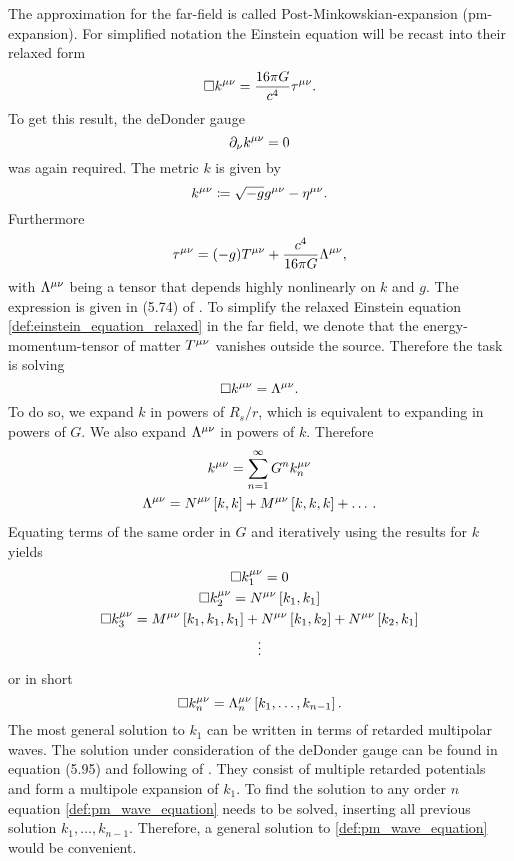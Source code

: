 The approximation for the far-field is called Post-Minkowskian-expansion (\gls{pm}-expansion). For simplified notation the Einstein equation will be recast into their relaxed form
\begin{equation}\label{def:einstein_equation_relaxed}
\Box k^{\mu\nu} = \frac{16\pi G}{c^4}\tau^{\mu\nu}.
\end{equation}
To get this result, the deDonder gauge
\begin{equation}
\partial_\nu k^{{\mu\nu}}=0
\end{equation}
was again required. The metric $k$ is given by
\begin{equation}
k^{\mu\nu}\coloneqq \sqrt{-g}g^{\mu\nu} -\eta^{\mu\nu}.
\end{equation}
Furthermore
\begin{equation}\label{def:pn_tau}
\tau^{\mu\nu} = {\left( -g \right)}T^{\mu\nu} + \frac{c^4}{16\pi G}\Lambda^{\mu\nu},
\end{equation}
with $\Lambda^{\mu\nu}$ being a tensor that depends highly nonlinearly on $k$ and $g$. The expression is given in (5.74) of \cite{gwv1}. To simplify the relaxed Einstein equation \eqref{def:einstein_equation_relaxed} in the far field, we denote that the energy-momentum-tensor of matter $T^{\mu\nu}$ vanishes outside the source. Therefore the task is solving
\begin{equation}
\Box k^{\mu\nu} = \Lambda^{\mu\nu}.
\end{equation}
To do so, we expand $k$ in powers of $R_s/r$, which is equivalent to expanding in powers of $G$. We also expand $\Lambda^{\mu\nu}$ in powers of $k$. Therefore
\begin{gather}
k^{\mu\nu}=\sum_{n=1}^\infty G^n k^{\mu\nu}_n\\
\Lambda^{\mu\nu} = N^{\mu\nu}\left[k,k\right] + M^{\mu\nu}\left[k,k,k\right]+\dotsc.
\end{gather}
Equating terms of the same order in $G$ and iteratively using the results for $k$ yields
\begin{gather}
\Box k^{\mu\nu}_1=0\\
\Box k^{\mu\nu}_2 = N^{\mu\nu}\left[k_1, k_1\right]\\
\Box k^{\mu\nu}_3 = M^{\mu\nu}\left[k_1, k_1, k_1\right]+N^{\mu\nu}\left[k_1,k_2\right]+N^{\mu\nu}\left[k_2,k_1\right]\\
\vdots\nonumber
\end{gather}
or in short
\begin{equation}\label{def:pm_wave_equation}
\Box k^{\mu\nu}_n=\Lambda^{\mu\nu}_n\left[k_1, \dotsc, k_{n-1}\right].
\end{equation}
The most general solution to $k_1$ can be written in terms of retarded multipolar waves. The solution under consideration of the deDonder gauge can be found in equation (5.95) and following of \cite{gwv1}. They consist of multiple retarded potentials and form a multipole expansion of $k_1$. To find the solution to any order $n$ equation \eqref{def:pm_wave_equation} needs to be solved, inserting all previous solution $k_1,\dotsc,k_{n-1}$. Therefore, a general solution to \eqref{def:pm_wave_equation} would be convenient.\\
